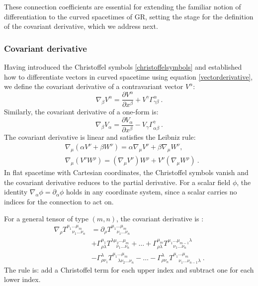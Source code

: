 These connection coefficients are essential for extending the familiar notion of differentiation to the curved spacetimes of GR, setting the stage for the definition of the covariant derivative, which we address next.



\subsubsection{Covariant derivative}

Having introduced the Christoffel symbols \eqref{christoffelsymbols} and established how to differentiate vectors in curved spacetime using equation \eqref{vectorderivative}, we define the covariant derivative of a contravariant vector $V^\alpha$:
\begin{equation}
\nabla_\beta V^\alpha = \frac{\partial V^\alpha}{\partial x^\beta} + V^\gamma \Gamma^\alpha_{\gamma \beta} \ .
\label{covariantderivative}
\end{equation}
Similarly, the covariant derivative of a one-form is:
\begin{equation}
\nabla_\beta V_\alpha = \frac{\partial V_\alpha}{\partial x^\beta} - V_\gamma \Gamma^\gamma_{\alpha \beta} \ .
\end{equation}
The covariant derivative is linear and satisfies the Leibniz rule:
\begin{equation}
\begin{aligned}
& \nabla_\mu (\alpha V^\nu + \beta W^\nu) = \alpha \nabla_\mu V^\nu + \beta \nabla_\mu W^\nu, \\
&\nabla_\mu (V^\nu W^\rho) = (\nabla_\mu V^\nu) W^\rho + V^\nu (\nabla_\mu W^\rho) \ .
\end{aligned}
\end{equation}
In flat spacetime with Cartesian coordinates, the Christoffel symbols vanish and the covariant derivative reduces to the partial derivative. For a scalar field $\phi$, the identity $\nabla_\alpha \phi = \partial_\alpha \phi$ holds in any coordinate system, since a scalar carries no indices for the connection to act on.

For a general tensor of type $(m, n)$, the covariant derivative is \cite{Llibre_Peter_Collier_unacosadificildecomprender}:
\begin{equation}
\begin{aligned}
\nabla_\rho T^{\mu_1 \dots \mu_m}_{\ \ \ \ \ \nu_1 \dots \nu_n} &= \partial_\rho T^{\mu_1 \dots \mu_m}_{\ \ \ \ \ \nu_1 \dots \nu_n}\\
&+ \Gamma^{\mu_1}_{\rho \lambda} T^{\lambda \mu_2 \dots \mu_m}_{\ \ \ \ \ \nu_1 \dots \nu_n}
+ \dots + \Gamma^{\mu_m}_{\rho \lambda} T^{\mu_1 \dots \mu_{m-1} \lambda}_{\ \ \ \ \ \nu_1 \dots \nu_n}\\
&- \Gamma^{\lambda}_{\rho \nu_1} T^{\mu_1 \dots \mu_m}_{\ \ \ \ \ \lambda \nu_2 \dots \nu_n}
- \dots
- \Gamma^{\lambda}_{\rho \nu_n} T^{\mu_1 \dots \mu_m}_{\ \ \ \ \ \nu_1 \dots \nu_{n-1} \lambda} \ .
\end{aligned}
\end{equation}
The rule is: add a Christoffel term for each upper index and subtract one for each lower index.

